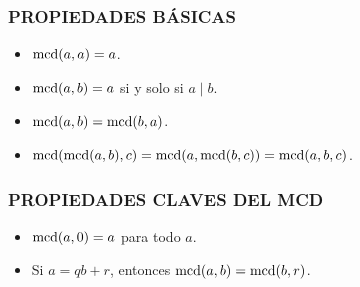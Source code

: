 \begin{frame}
  \frametitle{PROPIEDADES BÁSICAS}

  \begin{itemize}
  \item<2-> $\operatorname{mcd} (a,a) = a$.

  \item<3-> $\operatorname{mcd} (a,b) = a$ si y solo si $a\mid b$.

  \item<4-> $\operatorname{mcd} (a,b) = \operatorname{mcd} (b,a)$.

  \item<5-> $\operatorname{mcd} (\operatorname{mcd} (a,b), c) = \operatorname{mcd} (a, \operatorname{mcd} (b,c)) = \operatorname{mcd} (a,b,c)$.
  \end{itemize}

\end{frame}

\begin{frame}

  \vfill

  \begin{center}\huge\headingfont

    \vspace{1em}

  \end{center}

  \vfill
\end{frame}

\begin{frame}
  \frametitle{PROPIEDADES CLAVES DEL MCD}

  \begin{itemize}
  \item<2-> $\operatorname{mcd} (a,0) = a$ para todo $a$.


  \item<4-> Si $a = qb + r$, entonces $\operatorname{mcd} (a,b) = \operatorname{mcd} (b,r)$.

  \end{itemize}
\end{frame}

